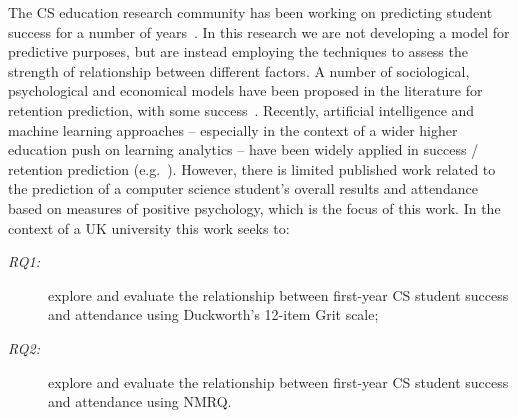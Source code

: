 \documentclass[sigconf]{acmart}
\begin{document}

The CS education research community has been working on predicting student success for a number of years~\cite{Robins2010}. In this research we are not developing a model for predictive purposes, but are instead employing the techniques to assess the strength of relationship between different factors. A number of sociological, psychological and economical models have been proposed in the literature for retention prediction, with some success~\cite{Seidman2012}. Recently, artificial intelligence and machine learning approaches -- especially in the context of a wider higher education push on learning analytics -- have been widely applied in success / retention prediction (e.g.~\cite{ Liao:2019:RML:3308443.3277569, Ahadi:2015:EML:2787622.2787717,Castro-Wunsch:2017:ENN:3017680.3017792, Quille:2018:PPS:3197091.3197101}).  However, there is limited published work related to the prediction of a computer science student's overall results and attendance based on measures of positive psychology, which is the focus of this work. In the context of a UK university this work seeks to:

\begin{description}
    \item[{\emph{RQ1:}}] explore and evaluate the relationship between first-year CS student success and attendance using Duckworth's 12-item Grit scale;
    \item[{\emph{RQ2:}}] explore and evaluate the relationship between first-year CS student success and attendance using NMRQ.
\end{description}
   
\end{document}
